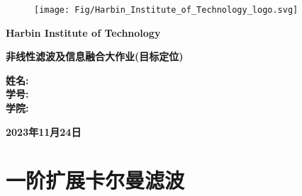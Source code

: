 \documentclass[12pt]{article}
\numberwithin{equation}{section} %
\begin{document}
\begin{titlepage}
\begin{center}
    \begin{figure}
        \centering        
        \texttt{[image: Fig/Harbin\_Institute\_of\_Technology\_logo.svg]} 
    \end{figure}
    \textbf{\LARGE{\selectfont Harbin Institute of Technology}}
\end{center}


\vspace{4em}

    

\begin{center}
    \textbf{\Huge{非线性滤波及信息融合大作业(目标定位)}}
\end{center}

\vspace{8em}

\begin{flushleft}
\begin{spacing}{2}
    \hspace{14em} \textbf{\large{姓名:\underline{\hspace{1.4em}\hspace{2em}}}}\\
    \hspace{14em} \textbf{\large{学号:\underline{\hspace{1em}\hspace{1em}}}}\\
    \hspace{14em} \textbf{\large{学院:\underline{\hspace{1em}\hspace{1.6em}}}}
\end{spacing}
\end{flushleft}


\vspace{8em}
\begin{center}
    \textbf{\large{2023年11月24日}}
\end{center}
\thispagestyle{empty} %
\end{titlepage}
\newpage

\tableofcontents    %
\thispagestyle{empty} %
\newpage
\setcounter{page}{1} %

\section{一阶扩展卡尔曼滤波}
\end{document}
